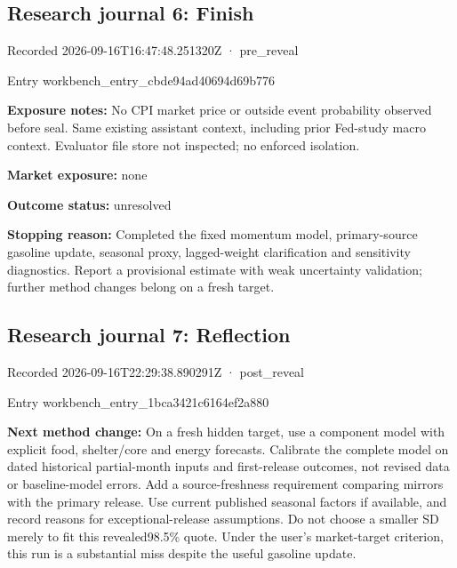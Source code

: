 \documentclass[11pt]{article}
\begin{document}
\subsection*{\textcolor{epdarkgreen}{Research journal 6: Finish}}
Recorded 2026-09-16T16:47:48.251320Z · pre\_reveal


Entry workbench\_en\hspace{0pt}try\_cbde94ad\hspace{0pt}40694d69b776


\par\noindent\textbf{Exposure notes:} No CPI market price or outside event probability observed before seal. Same existing assistant context, including prior Fed-study macro context. Evaluator file store not inspected; no enforced isolation.

\par\noindent\textbf{Market exposure:} none

\par\noindent\textbf{Outcome status:} unresolved

\par\noindent\textbf{Stopping reason:} Completed the fixed momentum model, primary-source gasoline update, seasonal proxy, lagged-weight clarification and sensitivity diagnostics. Report a provisional estimate with weak uncertainty validation; further method changes belong on a fresh target.

\subsection*{\textcolor{epdarkgreen}{Research journal 7: Reflection}}
Recorded 2026-09-16T22:29:38.890291Z · post\_reveal


Entry workbench\_en\hspace{0pt}try\_1bca3421\hspace{0pt}c6164ef2a880


\par\noindent\textbf{Next method change:} On a fresh hidden target, use a component model with explicit food, shelter/core and energy forecasts. Calibrate the complete model on dated historical partial-month inputs and first-release outcomes, not revised data or baseline-model errors. Add a source-freshness requirement comparing mirrors with the primary release. Use current published seasonal factors if available, and record reasons for exceptional-release assumptions. Do not choose a smaller SD merely to fit this revealed98.5\% quote. Under the user’s market-target criterion, this run is a substantial miss despite the useful gasoline update.
\end{document}
